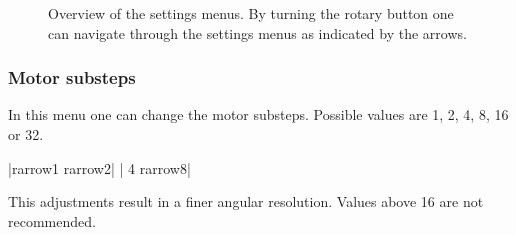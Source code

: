 \begin{figure}[H]
\caption[Overview of the settings menus.]{Overview of the settings menus. By turning
the rotary button one can navigate through the settings menus as indicated by the arrows.}
\label{settings_menu}
\end{figure}



\subsubsection{Motor substeps}
In this menu one can change the motor substeps. Possible values are 1,
2, 4, 8, 16 or 32.
\begin{center}
  |{rarrow}1      {rarrow}2|
             | 4      {rarrow}8|
\end{center}
This adjustments result in a finer angular resolution. Values above
16 are not recommended.


